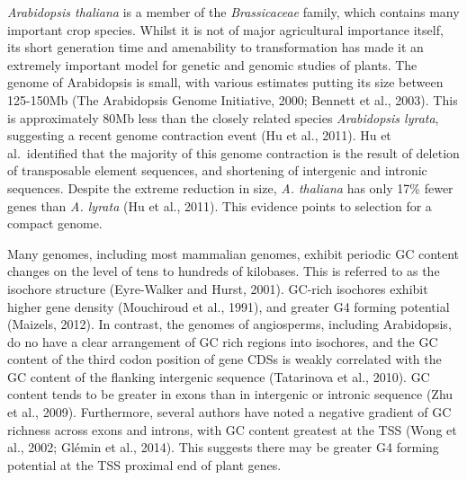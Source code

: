 \documentclass[12pt,a4paper,]{report}
\begin{document}
\emph{Arabidopsis thaliana} is a member of the \emph{Brassicaceae}
family, which contains many important crop species. Whilst it is not of
major agricultural importance itself, its short generation time and
amenability to transformation has made it an extremely important model
for genetic and genomic studies of plants. The genome of Arabidopsis is
small, with various estimates putting its size between 125-150Mb (The
Arabidopsis Genome Initiative, 2000; Bennett et al., 2003). This is
approximately 80Mb less than the closely related species
\emph{Arabidopsis lyrata}, suggesting a recent genome contraction event
(Hu et al., 2011). Hu et al.~identified that the majority of this genome
contraction is the result of deletion of transposable element sequences,
and shortening of intergenic and intronic sequences. Despite the extreme
reduction in size, \emph{A. thaliana} has only 17\% fewer genes than
\emph{A. lyrata} (Hu et al., 2011). This evidence points to selection
for a compact genome.

Many genomes, including most mammalian genomes, exhibit periodic GC
content changes on the level of tens to hundreds of kilobases. This is
referred to as the isochore structure (Eyre-Walker and Hurst, 2001).
GC-rich isochores exhibit higher gene density (Mouchiroud et al., 1991),
and greater G4 forming potential (Maizels, 2012). In contrast, the
genomes of angiosperms, including Arabidopsis, do no have a clear
arrangement of GC rich regions into isochores, and the GC content of the
third codon position of gene CDSs is weakly correlated with the GC
content of the flanking intergenic sequence (Tatarinova et al., 2010).
GC content tends to be greater in exons than in intergenic or intronic
sequence (Zhu et al., 2009). Furthermore, several authors have noted a
negative gradient of GC richness across exons and introns, with GC
content greatest at the TSS (Wong et al., 2002; Glémin et al., 2014).
This suggests there may be greater G4 forming potential at the TSS
proximal end of plant genes.
\end{document}
